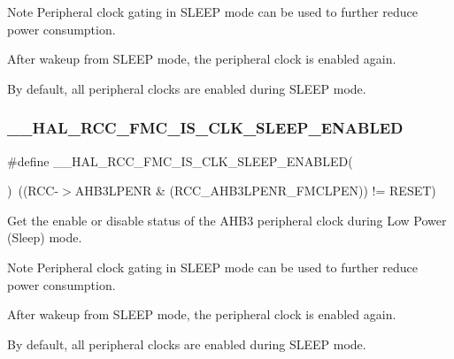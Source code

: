\begin{DoxyNote}{Note}
Peripheral clock gating in S\+L\+E\+EP mode can be used to further reduce power consumption. 

After wakeup from S\+L\+E\+EP mode, the peripheral clock is enabled again. 

By default, all peripheral clocks are enabled during S\+L\+E\+EP mode. 
\end{DoxyNote}
\mbox{\label{group___r_c_c___clock___sleep___enable___disable___status_ga48c04810c9a18c1a80f14361b3c421c6}} 
\subsubsection{\texorpdfstring{\_\_HAL\_RCC\_FMC\_IS\_CLK\_SLEEP\_ENABLED}{\_\_HAL\_RCC\_FMC\_IS\_CLK\_SLEEP\_ENABLED}}
{\footnotesize\ttfamily \#define \+\_\+\+\_\+\+H\+A\+L\+\_\+\+R\+C\+C\+\_\+\+F\+M\+C\+\_\+\+I\+S\+\_\+\+C\+L\+K\+\_\+\+S\+L\+E\+E\+P\+\_\+\+E\+N\+A\+B\+L\+ED(\begin{DoxyParamCaption}{ }\end{DoxyParamCaption})~((R\+CC-\/$>$A\+H\+B3\+L\+P\+E\+NR \& (R\+C\+C\+\_\+\+A\+H\+B3\+L\+P\+E\+N\+R\+\_\+\+F\+M\+C\+L\+P\+EN)) != R\+E\+S\+ET)}



Get the enable or disable status of the A\+H\+B3 peripheral clock during Low Power (Sleep) mode. 

\begin{DoxyNote}{Note}
Peripheral clock gating in S\+L\+E\+EP mode can be used to further reduce power consumption. 

After wakeup from S\+L\+E\+EP mode, the peripheral clock is enabled again. 

By default, all peripheral clocks are enabled during S\+L\+E\+EP mode. 
\end{DoxyNote}
\mbox{\label{group___r_c_c___clock___sleep___enable___disable___status_ga536dc31ed0e24ad8b82f5b8c2a920b42}} 
